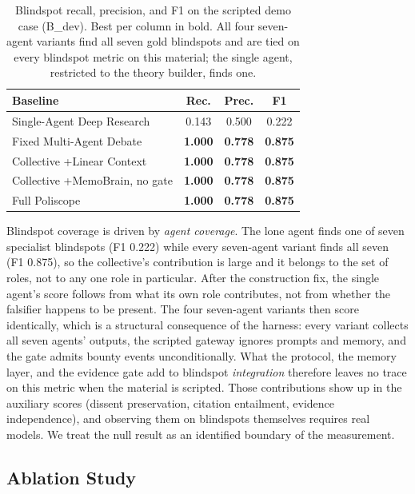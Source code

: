 \begin{table}[t]
\centering
\small
\begin{tabular}{@{}lccc@{}}
\toprule
\textbf{Baseline} & \textbf{Rec.} & \textbf{Prec.} & \textbf{F1} \\
\midrule
Single-Agent Deep Research & 0.143 & 0.500 & 0.222 \\
\midrule
Fixed Multi-Agent Debate & \textbf{1.000} & \textbf{0.778} & \textbf{0.875} \\
Collective +Linear Context & \textbf{1.000} & \textbf{0.778} & \textbf{0.875} \\
Collective +MemoBrain, no gate & \textbf{1.000} & \textbf{0.778} & \textbf{0.875} \\
Full Poliscope & \textbf{1.000} & \textbf{0.778} & \textbf{0.875} \\
\bottomrule
\end{tabular}
\caption{Blindspot recall, precision, and F1 on the scripted demo case
(B\_dev). Best per column in bold. All four seven-agent variants find all
seven gold blindspots and are tied on every blindspot metric on this
material; the single agent, restricted to the theory builder, finds one.}
\label{tab:results}
\end{table}

Blindspot coverage is driven by \emph{agent coverage}. The lone agent
finds one of seven specialist blindspots (F1 0.222) while every seven-agent
variant finds all seven (F1 0.875), so the collective's contribution is large
and it belongs to the set of roles, not to any one role in particular.
After the construction fix, the single agent's score follows from what its
own role contributes, not from whether the falsifier happens to be present.
The four seven-agent variants then score identically, which is a structural
consequence of the harness: every variant collects all seven agents' outputs,
the scripted gateway ignores prompts and memory, and the gate admits bounty
events unconditionally. What the protocol, the memory layer, and the evidence
gate add to blindspot \emph{integration} therefore leaves no trace on this
metric when the material is scripted. Those contributions show up in the
auxiliary scores (dissent preservation, citation entailment, evidence
independence), and observing them on blindspots themselves requires real
models. We treat the null result as an identified boundary of the
measurement.

\subsection{Ablation Study}

